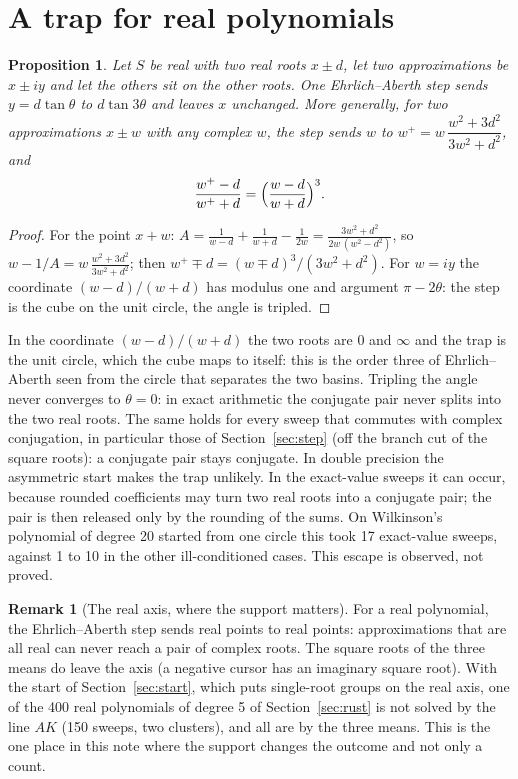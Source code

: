 \documentclass[10pt,a4paper]{article}
\newtheorem{proposition}[theorem]{Proposition}
\theoremstyle{definition}
\newtheorem{remark}[theorem]{Remark}
\numberwithin{equation}{section}
\begin{document}
\section{A trap for real polynomials}\label{sec:trap}
\begin{proposition}\label{prop:trap}
Let $S$ be real with two real roots $x\pm d$, let two approximations be $x\pm iy$ and let the others
sit on the other roots. One Ehrlich--Aberth step sends $y=d\tan\theta$ to $d\tan3\theta$ and leaves
$x$ unchanged. More generally, for two approximations $x\pm w$ with any complex $w$, the step sends
$w$ to $w^+=w\,\dfrac{w^2+3d^2}{3w^2+d^2}$, and
\[
 \frac{w^+-d}{w^++d}=\Bigl(\frac{w-d}{w+d}\Bigr)^{3}.
\]
\end{proposition}
\begin{proof}
For the point $x+w$: $A=\frac1{w-d}+\frac1{w+d}-\frac1{2w}=\frac{3w^2+d^2}{2w\,(w^2-d^2)}$, so
$w-1/A=w\,\frac{w^2+3d^2}{3w^2+d^2}$; then $w^+\mp d=(w\mp d)^3/(3w^2+d^2)$. For $w=iy$ the
coordinate $(w-d)/(w+d)$ has modulus one and argument $\pi-2\theta$: the step is the cube on the
unit circle, the angle is tripled.
\end{proof}
In the coordinate $(w-d)/(w+d)$ the two roots are $0$ and $\infty$ and the trap is the unit circle,
which the cube maps to itself: this is the order three of Ehrlich--Aberth seen from the circle that
separates the two basins.
Tripling the angle never converges to $\theta=0$: in exact arithmetic the conjugate pair never
splits into the two real roots. The same holds for every sweep that commutes with complex
conjugation, in particular those of Section~\ref{sec:step} (off the branch cut of the square
roots): a conjugate pair stays conjugate. In double precision the asymmetric start makes the trap
unlikely. In the exact-value sweeps it can occur, because
rounded coefficients may turn two real roots into a conjugate pair; the pair is then released only by
the rounding of the sums. On Wilkinson's polynomial of degree 20 started from one circle this took 17
exact-value sweeps, against 1 to 10 in the other ill-conditioned cases. This escape is observed, not
proved.

\begin{remark}[The real axis, where the support matters]\label{rem:axis}
For a real polynomial, the Ehrlich--Aberth step sends real points to real points: approximations
that are all real can never reach a pair of complex roots. The square roots of the three means do
leave the axis (a negative cursor has an imaginary square root). With the start of
Section~\ref{sec:start}, which puts single-root groups on the real axis, one of the 400 real
polynomials of degree 5 of Section~\ref{sec:rust} is not solved by the line $AK$ (150 sweeps, two
clusters), and all are by the three means. This is the one place in this note where the support
changes the outcome and not only a count.
\end{remark}
\end{document}
